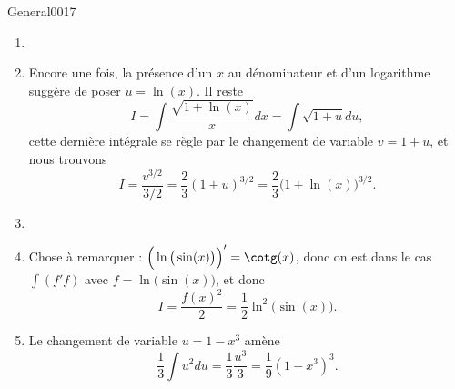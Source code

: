 \begin{corrige}{General0017}
\begin{enumerate}
\item
\item
Encore une fois, la présence d'un $x$ au dénominateur et d'un logarithme suggère de poser $u=\ln(x)$. Il reste
\begin{equation}
	I=\int\frac{ \sqrt{1+\ln(x)} }{ x }dx=\int\sqrt{1+u}du,
\end{equation}
cette dernière intégrale se règle par le changement de variable $v=1+u$, et nous trouvons
\begin{equation}
	I=\frac{ v^{3/2} }{ 3/2 }=\frac{ 2 }{ 3 }(1+u)^{3/2}=\frac{ 2 }{ 3 }\big(1+\ln(x)\big)^{3/2}.
\end{equation}

\item
\item
Chose à remarquer : $\Big( \ln\big( \sin(x) \big) \Big)'=\cotg(x)$, donc on est dans le cas $\int(f'f)$ avec $f=\ln\big( \sin(x) \big)$, et donc
\begin{equation}
	I=\frac{ f(x)^2 }{2}=\frac{ 1 }{2}\ln^2\big( \sin(x) \big).
\end{equation}

\item
Le changement de variable $u=1-x^3$ amène
\begin{equation}
	\frac{1}{ 3 }\int u^2du=\frac{1}{ 3 }\frac{ u^3 }{ 3 }=\frac{1}{ 9 }(1-x^3)^3.
\end{equation}
\end{enumerate}



\end{corrige}
